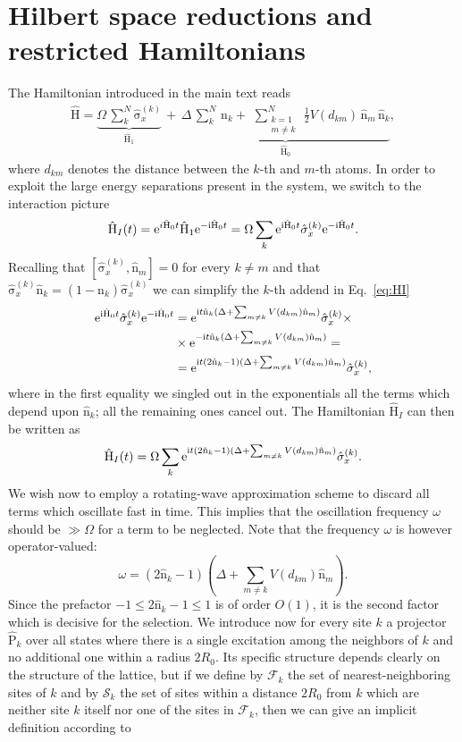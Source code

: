 \documentclass[prl,aps,twocolumn,showpacs,superscriptaddress,longbibliography]{revtex4-1}
\newcommand{\be}{\begin{equation}}
\newcommand{\ee}{\end{equation}}
\newcommand{\mal}{\mathcal}
\newcommand{\rmi}{{\rm{i}}}
\newcommand{\rme}[1]{{\rm{e}}^{#1}}
\newcommand{\ha}{\frac{1}{2}}
\newcommand{\comm}[2]{\left[ #1, #2 \right]}
\newcommand{\op}[1]{\mathrm{\hat{#1}}}
\begin{document}
\section{Hilbert space reductions and restricted Hamiltonians}
The Hamiltonian introduced in the main text reads 
\begin{align}
 \op{H} = \underbrace{\Omega \, \sum_k^N  \op{\sigma}_x^{(k)} }_{\op{H}_1}\, + \, \underbrace{ \Delta\, \sum_k^N\,\op{n}_k +\,  \,
 \sum_{\substack{k= 1\\ m \ne k}}^N \, \ha V(d_{km}) \, \op{n}_m\, \op{n}_k }_{\op{H}_0},
 \label{Eq:Hamil_full}
\end{align}
where $d_{km}$ denotes the distance between the $k$-th and $m$-th atoms. In order to exploit the large energy separations present in the system, we switch to the interaction picture
\be
\begin{split}
	\op{H}_I (t) = \rme{i\op{H}_0 t} \op{H}_1 \rme{-\rmi\op{H}_0 t} = \Omega \sum_k \rme{\rmi\op{H}_0 t} \op{\sigma}^{(k)}_x \rme{-\rmi\op{H}_0 t}. 
\end{split}
	\label{eq:HI}
\ee
Recalling that $\comm{\op{\sigma}_x^{(k)}}{\op{n}_m} = 0$ for every $k \neq m$ and that $\op{\sigma}_x^{(k)} \op{n}_k = (1 - \op{n}_k) \op{\sigma}_x^{(k)}$ we can simplify the $k$-th addend in Eq.~\eqref{eq:HI}
\be
\begin{split}
	\rme{\rmi\op{H}_0 t} \op{\sigma}^{(k)}_x \rme{-\rmi\op{H}_0 t} & = \rme{\rmi t \op{n}_k (\Delta + \sum_{m \neq k} V(d_{km}) \op{n}_m)} \op{\sigma}_x^{(k)}  \times \\ 
	& \times \rme{-\rmi t \op{n}_k (\Delta + \sum_{m \neq k} V(d_{km}) \op{n}_m)} = \\
	& = \rme{\rmi t (2\op{n}_k - 1) (\Delta + \sum_{m \neq k} V(d_{km}) \op{n}_m)} \op{\sigma}_x^{(k)},
\end{split}
\ee
where in the first equality we singled out in the exponentials all the terms which depend upon $\op{n}_k$; all the remaining ones cancel out. The Hamiltonian $\op{H}_I$ can then be written as
\be
	\op{H}_I (t) = \Omega \sum_k \rme{\rmi t (2\op{n}_k - 1) (\Delta + \sum_{m \neq k} V(d_{km}) \op{n}_m)} \op{\sigma}_x^{(k)}.
\ee
We wish now to employ a rotating-wave approximation scheme to discard all terms which oscillate fast in time. This implies that the oscillation frequency $\omega$ should be $\gg \Omega$ for a term to be neglected. Note that the frequency $\omega$ is however operator-valued:
\be
	\omega = (2\op{n}_k - 1) (\Delta + \sum_{m \neq k} V(d_{km}) \op{n}_m).
\ee
Since the prefactor $-1 \leq 2\op{n}_k - 1 \leq 1$ is of order $O(1)$, it is the second factor which is decisive for the selection. We introduce now for every site $k$ a projector $\op{P}_k$ over all states where there is a single excitation among the neighbors of $k$ and no additional one within a radius $2 R_0$. Its specific structure depends clearly on the structure of the lattice, but if we define by $\mal{F}_k$ the set of nearest-neighboring sites of $k$ and by $\mal{S}_k$ the set of sites within a distance $2R_0$ from $k$ which are neither site $k$ itself nor one of the sites in $\mal{F}_k$, then we can give an implicit definition according to
\end{document}

